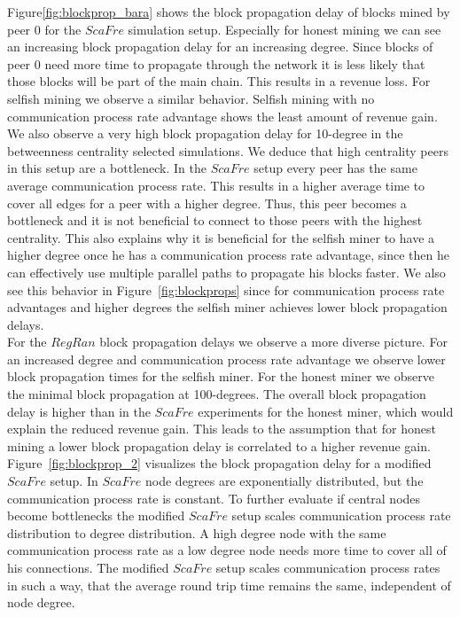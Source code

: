 Figure\ref{fig:blockprop_bara} shows the  block propagation delay of blocks mined by peer $0$ for the $ScaFre$ simulation setup. Especially for honest mining we can see an increasing block propagation delay for an increasing degree. Since blocks of peer $0$ need more time to propagate through the network it is less likely that those blocks will be part of the main chain. This results in a revenue loss. For selfish mining we observe a similar behavior. Selfish mining with no communication process rate advantage shows the least amount of revenue gain. We also observe a very high block propagation delay for 10-degree in the betweenness centrality selected simulations. We deduce that high centrality peers in this setup are a bottleneck. In the $ScaFre$ setup every peer has the same average communication process rate. This results in a higher average time to cover all edges for a peer with a higher degree. Thus, this peer becomes a bottleneck and it is not beneficial to connect to those peers with the highest centrality. This also explains why it is beneficial for the selfish miner to have a higher degree once he has a communication process rate advantage, since then he can effectively use multiple parallel paths to propagate his blocks faster. We also see this behavior in Figure~\ref{fig:blockprops} since for communication process rate advantages and higher degrees the selfish miner achieves lower block propagation delays.\\
For the $RegRan$ block propagation delays we observe a more diverse picture. For an increased degree and communication process rate advantage we observe lower block propagation times for the selfish miner. For the honest miner we observe the minimal block propagation at 100-degrees. The overall block propagation delay is higher than in the $ScaFre$ experiments for the honest miner, which would explain the reduced revenue gain. This leads to the assumption that for honest mining a lower block propagation delay is correlated to a higher revenue gain.\\
Figure~\ref{fig:blockprop_2} visualizes the block propagation delay for a modified $ScaFre$ setup. In $ScaFre$ node degrees are exponentially distributed, but the communication process rate is constant. To further evaluate if central nodes become bottlenecks the modified $ScaFre$ setup scales communication process rate distribution to degree distribution. A high degree node with the same communication process rate as a low degree node needs more time to cover all of his connections. The modified $ScaFre$ setup scales communication process rates in such a way, that the average round trip time remains the same, independent of node degree.
